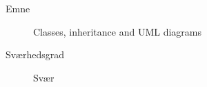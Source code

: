 \begin{description}
\item[Emne]  Classes, inheritance and UML diagrams
\item[Sværhedsgrad] Svær
\end{description}
